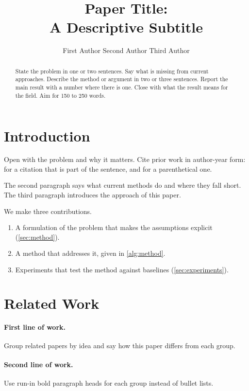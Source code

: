 \documentclass[twocolumn]{ulpaper}
\title{Paper Title:\\A Descriptive Subtitle}
\author{First Author\affil{1} \And Second Author\affil{1,2} \AND Third Author\affil{2}}
\affil{2}Second Institution, City, Country.}
\begin{document}
\maketitle

\begin{abstract}
State the problem in one or two sentences. Say what is missing from current approaches. Describe the method or argument in two or three sentences. Report the main result with a number where there is one. Close with what the result means for the field. Aim for 150 to 250 words.
\end{abstract}

\section{Introduction}
\label{sec:intro}

Open with the problem and why it matters. Cite prior work in author-year form: \citet{vaswani2017attention} for a citation that is part of the sentence, and \citep{kingma2015adam} for a parenthetical one.

The second paragraph says what current methods do and where they fall short. The third paragraph introduces the approach of this paper.

We make three contributions.
\begin{enumerate}
  \item A formulation of the problem that makes the assumptions explicit (\cref{sec:method}).
  \item A method that addresses it, given in \cref{alg:method}.
  \item Experiments that test the method against baselines (\cref{sec:experiments}).
\end{enumerate}

\section{Related Work}
\label{sec:related}

\paragraph{First line of work.} Group related papers by idea and say how this paper differs from each group.

\paragraph{Second line of work.} Use run-in bold paragraph heads for each group instead of bullet lists.
\end{document}
